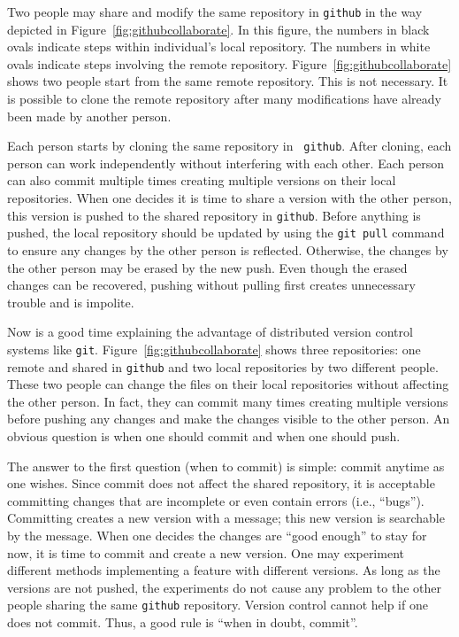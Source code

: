 Two people may share and modify the same repository in {\tt github} in
the way depicted in Figure~\ref{fig:githubcollaborate}.  In this
figure, the numbers in black ovals indicate steps within individual's
local repository.  The numbers in white ovals indicate steps involving
the remote repository.
Figure~\ref{fig:githubcollaborate} shows two people start from the
same remote repository. This is not necessary.  It is possible
to clone the remote repository after many modifications have already
been made by another person.

Each person starts by cloning the same repository in {\tt
  github}. After cloning, each person can work independently without
interfering with each other. Each person can also commit multiple
times creating multiple versions on their local repositories.  When
one decides it is time to share a version with the other person, this
version is pushed to the shared repository in {\tt github}.  Before
anything is pushed, the local repository should be updated by using
the {\tt git pull} command to ensure any changes by the other person
is reflected. Otherwise, the changes by the other person may be erased
by the new push.  Even though the erased changes can be recovered,
pushing without pulling first creates unnecessary trouble and is
impolite.



Now is a good time explaining the advantage of distributed version
control systems like {\tt git}.  Figure~\ref{fig:githubcollaborate}
shows three repositories: one remote and shared in {\tt github} and
two local repositories by two different people. These two people can
change the files on their local repositories without affecting the
other person.  In fact, they can commit many times creating multiple
versions before pushing any changes and make the changes visible to
the other person.  An obvious question is when one should commit
and when one should push.

The answer to the first question (when to commit) is simple: commit
anytime as one wishes.  Since commit does not affect the shared
repository, it is acceptable committing changes that are incomplete or
even contain errors (i.e., ``bugs''). Committing creates a new version
with a message; this new version is searchable by the message.  When
one decides the changes are ``good enough'' to stay for now, it is
time to commit and create a new version.  One may experiment different
methods implementing a feature with different versions. As long as the
versions are not pushed, the experiments do not cause any problem to
the other people sharing the same {\tt github} repository.  Version
control cannot help if one does not commit. Thus, a good rule is
``when in doubt, commit''.

